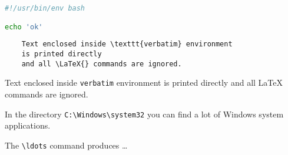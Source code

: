 \begin{lstlisting}[language=bash]
#!/usr/bin/env bash

echo 'ok'
\end{lstlisting}


\begin{verbatim}
    Text enclosed inside \texttt{verbatim} environment 
    is printed directly 
    and all \LaTeX{} commands are ignored.
\end{verbatim}

\begin{verbatim*}
    Text enclosed inside \texttt{verbatim} environment 
    is printed directly 
    and all \LaTeX{} commands are ignored.
\end{verbatim*}


In the directory \verb|C:\Windows\system32| you can find a lot of Windows 
system applications. 
 
The \verb+\ldots+ command produces \ldots
\fi
